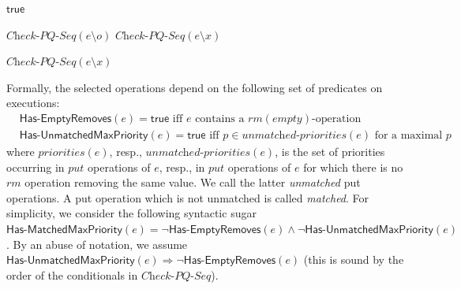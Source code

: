 \documentclass[a4paper,UKenglish]{lipics-v2016}
\begin{document}
\begin{algorithm}[t]
\footnotesize{

{\Return $\mathsf{true}$\;}

{
    {
        \KwRet $\textit{Check-PQ-Seq}(e \setminus o)$\;
    }
}
{
    {
        \KwRet $\textit{Check-PQ-Seq}(e \setminus x)$\;
    }
}

\Else
{
    {
        \KwRet $\textit{Check-PQ-Seq}(e \setminus x)$\;
    }
}}
\caption{$\textit{Check-PQ-Seq}$}
\label{alg:seq_check}
\end{algorithm}


Formally, the selected operations depend on the following set of predicates on executions:
\begin{align*}
& \mathsf{Has\text{-}EmptyRemoves}(e)=\mathsf{true} \mbox{ iff  $e$ contains a $\textit{rm}(\textit{empty})$-operation} \hspace{1cm}\\
& \mathsf{Has\text{-}UnmatchedMaxPriority}(e)=\mathsf{true} \mbox{ iff $p\in \textit{unmatched-priorities}(e)$ for a maximal $p$} 
\end{align*}
where $\textit{priorities}(e)$, resp., $\textit{unmatched-priorities}(e)$, is the set of priorities occurring in $\textit{put}$ operations of $e$, resp., in $\textit{put}$ operations of $e$ for which there is no $\textit{rm}$ operation removing the same value. We call the latter \emph{unmatched} put operations. A put operation which is not unmatched is called \emph{matched}. For simplicity, we consider the following syntactic sugar $\mathsf{Has\text{-}MatchedMaxPriority}(e)=\neg \mathsf{Has\text{-}EmptyRemoves}(e)\land \neg \mathsf{Has\text{-}UnmatchedMaxPriority}(e)$. By an abuse of notation, we assume  $\mathsf{Has\text{-}UnmatchedMaxPriority}(e) \Rightarrow \neg \mathsf{Has\text{-}EmptyRemoves}(e)$ (this is sound by the order of the conditionals in $\textit{Check-PQ-Seq}$).
\end{document}
